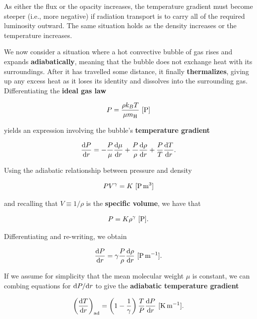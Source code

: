 \documentclass[a4paper,10pt]{article}
\begin{document}
{\noindent}As either the flux or the opacity increases, the temperature gradient must become steeper (i.e., more negative) if radiation transport is to carry all of the required luminosity outward. The same situation holds as the density increases or the temperature increases.

{\noindent}We now consider a situation where a hot convective bubble of gas rises and expands \textbf{adiabatically}, meaning that the bubble does not exchange heat with its surroundings. After it has travelled some distance, it finally \textbf{thermalizes}, giving up any excess heat as it loses its identity and dissolves into the surrounding gas. Differentiating the \textbf{ideal gas law}

\begin{align*}
    P = \frac{\rho k_BT}{\mu m_{\rm H}} ~ [{\rm P}]
\end{align*}

{\noindent}yields an expression involving the bubble's \textbf{temperature gradient}

\begin{align*}
    \frac{{\rm d}P}{{\rm d}r} = -\frac{P}{\mu}\frac{{\rm d}\mu}{{\rm d}r} + \frac{P}{\rho}\frac{{\rm d}\rho}{{\rm d}r} + \frac{P}{T}\frac{{\rm d}T}{{\rm d}r}.
\end{align*}

{\noindent}Using the adiabatic relationship between pressure and density

\begin{align*}
    PV^\gamma = K ~ [{\rm P\,m^3}]
\end{align*}

{\noindent}and recalling that $V\equiv1/\rho$ is the \textbf{specific volume}, we have that

\begin{align*}
    P = K\rho^\gamma ~ [{\rm P}].
\end{align*}

{\noindent}Differentiating and re-writing, we obtain

\begin{align*}
    \frac{{\rm d}P}{{\rm d}r} = \gamma \frac{P}{\rho}\frac{{\rm d}\rho}{{\rm d}r} ~ [{\rm P\,m^{-1}}].
\end{align*}

{\noindent}If we assume for simplicity that the mean molecular weight $\mu$ is constant, we can combing equations for ${\rm d}P/{\rm d}r$ to give the \textbf{adiabatic temperature gradient}

\begin{align*}
    \left(\frac{{\rm d}T}{{\rm d}r}\right)_{\rm ad} = \left(1-\frac{1}{\gamma}\right) \frac{T}{P}\frac{{\rm d}P}{{\rm d}r} ~ [{\rm K\,m^{-1}}].
\end{align*}
\end{document}
